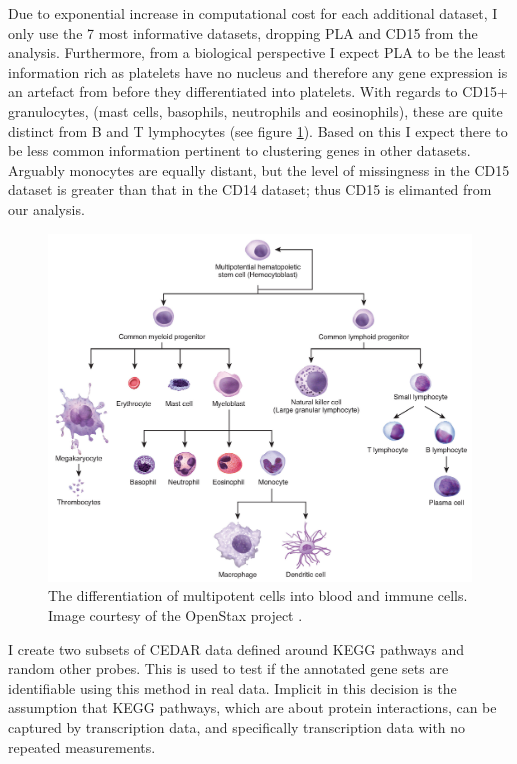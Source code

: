 \documentclass[12pt]{article} %
\begin{document}
	
	Due to exponential increase in computational cost for each additional dataset, I only use the 7 most informative datasets, dropping PLA and CD15 from the analysis. Furthermore, from a biological perspective I expect PLA to be the least information rich as platelets have no nucleus \cite{Wrighthistogenesisbloodplatelets1910} and therefore any gene expression is an artefact from before they differentiated into platelets. With regards to CD15+ granulocytes, (mast cells, basophils, neutrophils and eosinophils), these are quite distinct from B and T lymphocytes (see figure \ref{fig:white_blood_cell_differentiation}). Based on this I expect there to be less common information pertinent to clustering genes in other datasets. Arguably monocytes are equally distant, but the level of missingness in the CD15 dataset is greater than that in the CD14 dataset; thus CD15 is elimanted from our analysis.

	\begin{figure}[h]
		\centering
		\includegraphics[scale=0.75]{Images/white_blood_cell_differentiation.jpg}
		\caption{The differentiation of multipotent cells into blood and immune cells. Image courtesy of the OpenStax project \cite{OpenStaxAnatomyPhysiology2016}.}
		\label{fig:white_blood_cell_differentiation}
	\end{figure}

	 I create two subsets of CEDAR data defined around KEGG pathways and random other probes. This is used to test if the annotated gene sets are identifiable using this method in real data. Implicit in this decision is the assumption that KEGG pathways, which are about protein interactions, can be captured by transcription data, and specifically transcription data with no repeated measurements. 
	 
\end{document}
